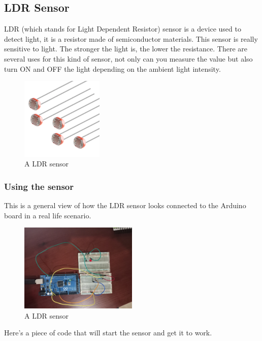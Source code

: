 \subsection{LDR Sensor}
LDR\cite{ldr} (which stands for Light Dependent Resistor) sensor is a device used to detect light, it is a resistor made of semiconductor materials. This sensor is really sensitive to light. The stronger the light is, the lower the resistance. There are several uses for this kind of sensor, not only can you measure the value but also turn ON and OFF the light depending on the ambient light intensity.

\begin{figure}[htp]
    \centering
    \includegraphics[width=0.35\textwidth]{fig/ldr.jpg}
    \caption{A LDR sensor}
    \label{fig:ldr}
\end{figure}

\subsubsection{Using the sensor}

This is a general view of how the LDR sensor looks connected to the Arduino board in a real life scenario.

\begin{figure}[H]
    \centering
    \includegraphics[width=0.5\textwidth]{fig/ldr-circuit.jpg}
    \caption{A LDR sensor}
    \label{fig:ldr}
\end{figure}

Here's a piece of code that will start the sensor and get it to work.


